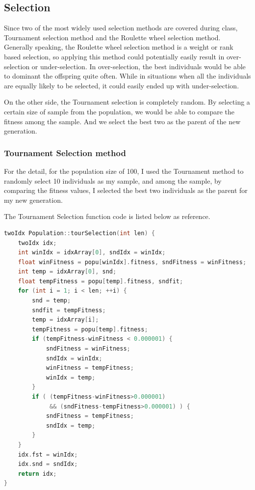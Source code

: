 \documentclass[10pt,b5paper]{article}
\begin{document}
\subsection{Selection}
\label{sec-2-6}
Since two of the most widely used selection methods are covered during class, Tournament selection method and the Roulette wheel selection method. Generally speaking, the Roulette wheel selection method is a weight or rank based selection, so applying this method could potentially easily result in over-selection or under-selection. In over-selection, the best individuals would be able to dominant the offspring quite often. While in situations when all the individuals are equally likely to be selected, it could easily ended up with under-selection.

On the other side, the Tournament selection is completely random. By selecting a certain size of sample from the population, we would be able to compare the fitness among the sample. And we select the best two as the parent of the new generation. 

\subsubsection{Tournament Selection method}
\label{sec-2-6-1}
For the detail, for the population size of 100, I used the Tournament method to randomly select 10 individuals as my sample, and among the sample, by comparing the fitness values, I selected the best two individuals as the parent for my new generation. 

The Tournament Selection function code is listed below as reference. 
\begin{lstlisting}[language=c++]
twoIdx Population::tourSelection(int len) {
    twoIdx idx;
    int winIdx = idxArray[0], sndIdx = winIdx;
    float winFitness = popu[winIdx].fitness, sndFitness = winFitness;
    int temp = idxArray[0], snd;
    float tempFitness = popu[temp].fitness, sndfit;
    for (int i = 1; i < len; ++i) {
        snd = temp;
        sndfit = tempFitness;
        temp = idxArray[i];
        tempFitness = popu[temp].fitness;
        if (tempFitness-winFitness < 0.000001) {        
            sndFitness = winFitness;
            sndIdx = winIdx;
            winFitness = tempFitness;
            winIdx = temp;
        }
        if ( (tempFitness-winFitness>0.000001)
             && (sndFitness-tempFitness>0.000001) ) {
            sndFitness = tempFitness;
            sndIdx = temp;
        }
    }
    idx.fst = winIdx;
    idx.snd = sndIdx;
    return idx;
}
\end{lstlisting}
\end{document}
